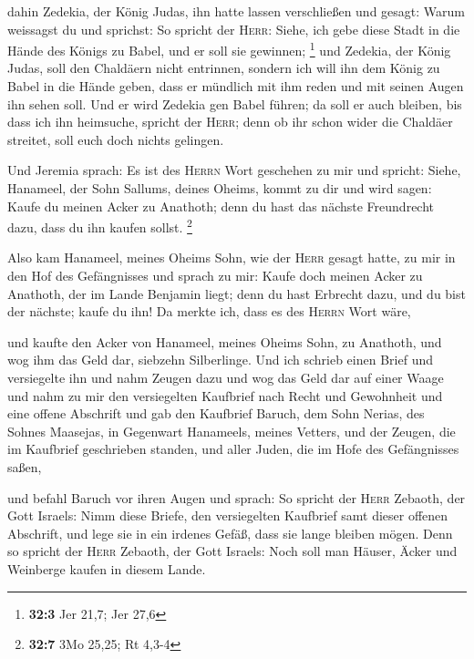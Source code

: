  dahin Zedekia, der König Judas, ihn hatte lassen
verschließen und gesagt: Warum weissagst du und sprichst: So spricht der
\textsc{Herr}: Siehe, ich gebe diese Stadt in die Hände des Königs zu
Babel, und er soll sie gewinnen; \footnote{\textbf{32:3} Jer 21,7; Jer
  27,6}  und Zedekia, der König Judas, soll den Chaldäern
nicht entrinnen, sondern ich will ihn dem König zu Babel in die Hände
geben, dass er mündlich mit ihm reden und mit seinen Augen ihn sehen
soll.  Und er wird Zedekia gen Babel führen; da soll er
auch bleiben, bis dass ich ihn heimsuche, spricht der \textsc{Herr};
denn ob ihr schon wider die Chaldäer streitet, soll euch doch nichts
gelingen.

 Und Jeremia sprach: Es ist des \textsc{Herrn} Wort
geschehen zu mir und spricht:  Siehe, Hanameel, der Sohn
Sallums, deines Oheims, kommt zu dir und wird sagen: Kaufe du meinen
Acker zu Anathoth; denn du hast das nächste Freundrecht dazu, dass du
ihn kaufen sollst. \footnote{\textbf{32:7} 3Mo 25,25; Rt 4,3-4}

 Also kam Hanameel, meines Oheims Sohn, wie der
\textsc{Herr} gesagt hatte, zu mir in den Hof des Gefängnisses und
sprach zu mir: Kaufe doch meinen Acker zu Anathoth, der im Lande
Benjamin liegt; denn du hast Erbrecht dazu, und du bist der nächste;
kaufe du ihn! Da merkte ich, dass es des \textsc{Herrn} Wort wäre,

 und kaufte den Acker von Hanameel, meines Oheims Sohn, zu
Anathoth, und wog ihm das Geld dar, siebzehn Silberlinge.
 Und ich schrieb einen Brief und versiegelte ihn und nahm
Zeugen dazu und wog das Geld dar auf einer Waage  und
nahm zu mir den versiegelten Kaufbrief nach Recht und Gewohnheit und
eine offene Abschrift  und gab den Kaufbrief Baruch, dem
Sohn Nerias, des Sohnes Maasejas, in Gegenwart Hanameels, meines
Vetters, und der Zeugen, die im Kaufbrief geschrieben standen, und aller
Juden, die im Hofe des Gefängnisses saßen,

 und befahl Baruch vor ihren Augen und sprach:
 So spricht der \textsc{Herr} Zebaoth, der Gott Israels:
Nimm diese Briefe, den versiegelten Kaufbrief samt dieser offenen
Abschrift, und lege sie in ein irdenes Gefäß, dass sie lange bleiben
mögen.  Denn so spricht der \textsc{Herr} Zebaoth, der
Gott Israels: Noch soll man Häuser, Äcker und Weinberge kaufen in diesem
Lande.

